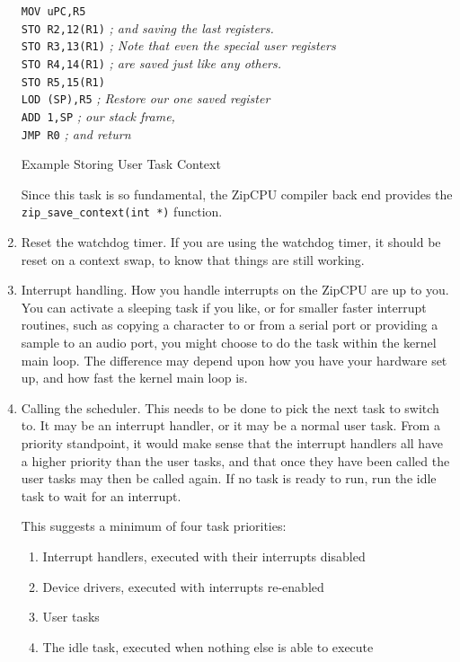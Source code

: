 \documentclass{gqtekspec}
\begin{document}
\begin{enumerate}
\begin{table}
\begin{center}
\begin{tabbing}
\>        {\tt MOV uPC,R5} \\
\>        {\tt STO R2,12(R1)}	\> {\em ; and saving the last registers.}\\
\>        {\tt STO R3,13(R1)}	\> {\em ; Note that even the special user registers }\\
\>        {\tt STO R4,14(R1)}	\> {\em ; are saved just like any others. }\\
\>        {\tt STO R5,15(R1)} \\
\>        {\tt LOD (SP),R5}	\> {\em ; Restore our one saved register}\\
\>        {\tt ADD 1,SP}		\> {\em ; our stack frame,} \\
\>        {\tt JMP R0}		\> {\em ; and return }\\
\end{tabbing}
\caption{Example Storing User Task Context}\label{tbl:context-out}
\end{center}\end{table}
Since this task is so fundamental, the ZipCPU compiler back end provides
the {\tt zip\_save\_context(int *)} function.  

\item Reset the watchdog timer.  If you are using the watchdog timer, it should
	be reset on a context swap, to know that things are still working.

\item Interrupt handling.  How you handle interrupts on the ZipCPU are up to
	you.  You can activate a sleeping task if you like, or for smaller
	faster interrupt routines, such as copying a character to or from a 
	serial port or providing a sample to an audio port, you might choose
	to do the task within the kernel main loop.  The difference may 
	depend upon how you have your hardware set up, and how fast the
	kernel main loop is.

\item Calling the scheduler.  This needs to be done to pick the next task
	to switch to.  It may be an interrupt handler, or it may  be a normal
	user task.  From a priority standpoint, it would make sense that the
	interrupt handlers all have a higher priority than the user tasks,
	and that once they have been called the user tasks may then be called
	again.  If no task is ready to run, run the idle task to wait for an
	interrupt.

	This suggests a minimum of four task priorities:
	\begin{enumerate}
	\item Interrupt handlers, executed with their interrupts disabled
	\item Device drivers, executed with interrupts re-enabled
	\item User tasks
	\item The idle task, executed when nothing else is able to execute
	\end{enumerate}


\end{enumerate}
\end{document}
